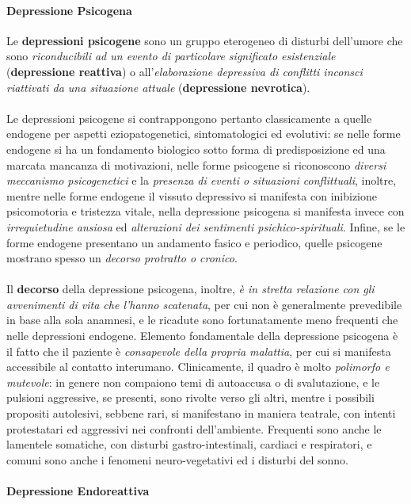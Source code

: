 \paragraph{Depressione Psicogena}

Le \textbf{depressioni psicogene} sono un gruppo eterogeneo di disturbi
dell'umore che sono \emph{riconducibili ad un evento di particolare
significato esistenziale} (\textbf{depressione reattiva}) o
all'\emph{elaborazione depressiva di conflitti inconsci riattivati da
una situazione attuale} (\textbf{depressione nevrotica}).
\\\\
Le depressioni psicogene si contrappongono pertanto classicamente a
quelle endogene per aspetti eziopatogenetici, sintomatologici ed
evolutivi: se nelle forme endogene si ha un fondamento biologico sotto
forma di predisposizione ed una marcata mancanza di motivazioni, nelle
forme psicogene si riconoscono \emph{diversi meccanismo psicogenetici} e
la \emph{presenza di eventi o situazioni conflittuali}, inoltre, mentre
nelle forme endogene il vissuto depressivo si manifesta con inibizione
psicomotoria e tristezza vitale, nella depressione psicogena si
manifesta invece con \emph{irrequietudine ansiosa} ed \emph{alterazioni
dei sentimenti psichico-spirituali}. Infine, se le forme endogene
presentano un andamento fasico e periodico, quelle psicogene mostrano
spesso un \emph{decorso protratto o cronico}.
\\\\
Il \textbf{decorso} della depressione psicogena, inoltre, \emph{è in
stretta relazione con gli avvenimenti di vita che l'hanno scatenata},
per cui non è generalmente prevedibile in base alla sola anamnesi, e le
ricadute sono fortunatamente meno frequenti che nelle depressioni
endogene. Elemento fondamentale della depressione psicogena è il fatto
che il paziente è \emph{consapevole della propria malattia}, per cui si
manifesta accessibile al contatto interumano. Clinicamente, il quadro è
molto \emph{polimorfo e mutevole}: in genere non compaiono temi di
autoaccusa o di svalutazione, e le pulsioni aggressive, se presenti,
sono rivolte verso gli altri, mentre i possibili propositi autolesivi,
sebbene rari, si manifestano in maniera teatrale, con intenti
protestatari ed aggressivi nei confronti dell'ambiente. Frequenti sono
anche le lamentele somatiche, con disturbi gastro-intestinali, cardiaci
e respiratori, e comuni sono anche i fenomeni neuro-vegetativi ed i
disturbi del sonno.

\paragraph{Depressione Endoreattiva}


